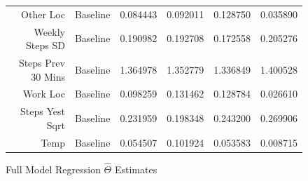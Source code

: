 \begin{figure}
\begin{tabular}{rl|rrrr}
Other Loc & Baseline          &   0.084443 &       0.092011 &       0.128750 &       0.035890 \\
Weekly Steps SD & Baseline    &   0.190982 &       0.192708 &       0.172558 &       0.205276 \\
Steps Prev 30 Mins & Baseline &   1.364978 &       1.352779 &       1.336849 &       1.400528 \\
Work Loc & Baseline           &   0.098259 &       0.131462 &       0.128784 &       0.026610 \\
Steps Yest Sqrt & Baseline    &   0.231959 &       0.198348 &       0.243200 &       0.269906 \\
Temp & Baseline               &   0.054507 &       0.101924 &       0.053583 &       0.008715 \\
\bottomrule
\end{tabular}

\caption{Full Model Regression $\hat{\Theta}$ Estimates}
\end{figure}

